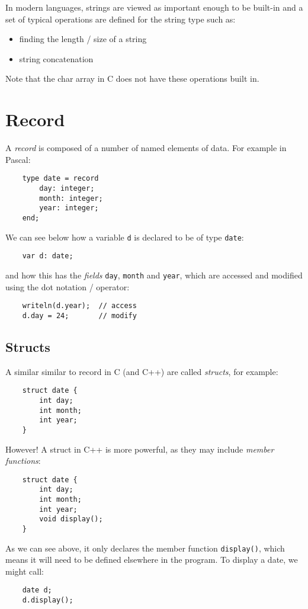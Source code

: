 In modern languages, strings are viewed as important enough to be built-in and a set of typical operations are defined for the string type such as:
\begin{itemize}
    \item finding the length / size of a string
    \item string concatenation
\end{itemize}
Note that the char array in C does not have these operations built in. 

\section{Record}
A \textit{record} is composed of a number of named elements of data. For example in Pascal:
\begin{verbatim}
    type date = record
        day: integer;
        month: integer;
        year: integer;
    end;
\end{verbatim}

We can see below how a variable \verb|d| is declared to be of type \verb|date|:
\begin{verbatim}
    var d: date;
\end{verbatim}
and how this has the \textit{fields} \verb|day|, \verb|month| and \verb|year|, which are accessed and modified using the dot notation / operator:
\begin{verbatim}
    writeln(d.year);  // access
    d.day = 24;       // modify
\end{verbatim}

\subsection{Structs}
A similar similar to record in C (and C++) are called \textit{structs}, for example:
\begin{verbatim}
    struct date {
        int day;
        int month;
        int year;
    }
\end{verbatim}
However! A struct in C++ is more powerful, as they may include \textit{member functions}:
\begin{verbatim}
    struct date {
        int day;
        int month;
        int year;
        void display();
    }
\end{verbatim}
As we can see above, it only declares the member function \verb|display()|, which means it will need to be defined elsewhere in the program. To display a date, we might call:
\begin{verbatim}
    date d;
    d.display();
\end{verbatim}

